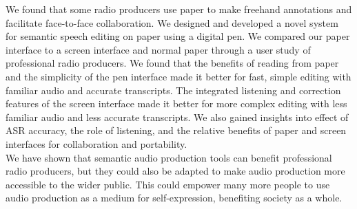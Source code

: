 We found that some radio producers use paper to make freehand annotations and facilitate face-to-face collaboration.
We designed and developed a novel system for semantic speech editing on paper using a digital pen. We compared our
paper interface to a screen interface and normal paper through a user study of professional radio producers. We found
that the benefits of reading from paper and the simplicity of the pen interface made it better for fast, simple editing
with familiar audio and accurate transcripts.  The integrated listening and correction features of the screen interface
made it better for more complex editing with less familiar audio and less accurate transcripts.  We also gained
insights into effect of ASR accuracy, the role of listening, and the relative benefits of paper and screen interfaces
for collaboration and portability.
\\











We have shown that semantic audio production tools can benefit professional radio producers, but they could also be
adapted to make audio production more accessible to the wider public. This could empower many more people to 
use audio production as a medium for self-expression, benefiting society as a whole.

